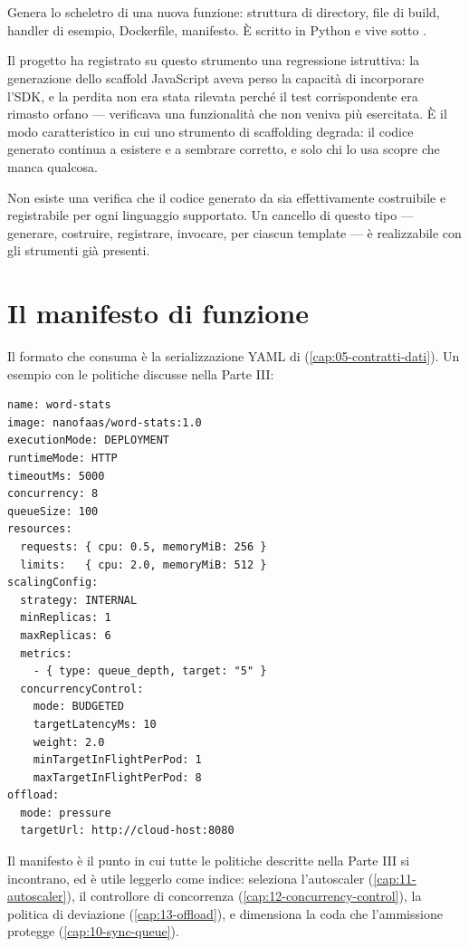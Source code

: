 \section{}

Genera lo scheletro di una nuova funzione: struttura di directory, file di
build, handler di esempio, Dockerfile, manifesto. \`E scritto in Python e vive
sotto .

Il progetto ha registrato su questo strumento una regressione istruttiva: la
generazione dello scaffold JavaScript aveva perso la capacit\`a di incorporare
l'SDK, e la perdita non era stata rilevata perch\'e il test corrispondente era
rimasto orfano --- verificava una funzionalit\`a che non veniva pi\`u esercitata.
\`E il modo caratteristico in cui uno strumento di scaffolding degrada: il codice
generato continua a esistere e a sembrare corretto, e solo chi lo usa scopre che
manca qualcosa.

\begin{damisurare}
Non esiste una verifica che il codice generato da  sia
effettivamente costruibile e registrabile per ogni linguaggio supportato. Un
cancello di questo tipo --- generare, costruire, registrare, invocare, per
ciascun template --- \`e realizzabile con gli strumenti gi\`a presenti.
\end{damisurare}

\section{Il manifesto di funzione}

Il formato che  consuma \`e la serializzazione YAML di
 (\cref{cap:05-contratti-dati}). Un esempio con le politiche
discusse nella Parte III:

\begin{lstlisting}[language=yamlnf, caption={Manifesto con controllo di
concorrenza a budget e offload reattivo.}]
name: word-stats
image: nanofaas/word-stats:1.0
executionMode: DEPLOYMENT
runtimeMode: HTTP
timeoutMs: 5000
concurrency: 8
queueSize: 100
resources:
  requests: { cpu: 0.5, memoryMiB: 256 }
  limits:   { cpu: 2.0, memoryMiB: 512 }
scalingConfig:
  strategy: INTERNAL
  minReplicas: 1
  maxReplicas: 6
  metrics:
    - { type: queue_depth, target: "5" }
  concurrencyControl:
    mode: BUDGETED
    targetLatencyMs: 10
    weight: 2.0
    minTargetInFlightPerPod: 1
    maxTargetInFlightPerPod: 8
offload:
  mode: pressure
  targetUrl: http://cloud-host:8080
\end{lstlisting}

Il manifesto \`e il punto in cui tutte le politiche descritte nella Parte III si
incontrano, ed \`e utile leggerlo come indice: 
seleziona l'autoscaler (\cref{cap:11-autoscaler}),
 il controllore di concorrenza
(\cref{cap:12-concurrency-control}),  la politica di deviazione
(\cref{cap:13-offload}), e  dimensiona la coda che l'ammissione
protegge (\cref{cap:10-sync-queue}).
